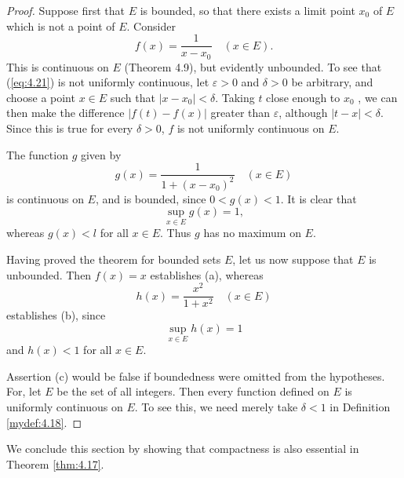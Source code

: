 \begin{proof}
    Suppose first that $E$ is bounded, 
    so that there exists a limit point $x_0$ of $E$ 
    which is not a point of $E$. 
    Consider
    \begin{equation}
        \label{eq:4.21}
        f(x) = \frac{1}{x - x_0}
        \quad
        (x \in E).
    \end{equation}
    This is continuous on $E$ (Theorem 4.9), but evidently unbounded. 
    To see that (\ref{eq:4.21}) is not uniformly continuous, 
    let $\varepsilon > 0$ and $\delta > 0$ be arbitrary, 
    and choose a point $x \in E$ such that $\left| x - x_0 \right| < \delta$.
    Taking $t$ close enough to $x_0$ , 
    we can then make the difference $\left| f(t) - f(x) \right|$ greater than $\varepsilon$, although $\left| t-x \right| < \delta$.
    Since this is true for every $\delta > 0$, 
    $f$ is not uniformly continuous on $E$.

    The function $g$ given by
    \begin{equation}
        \label{eq:4.22}
        g(x) = \frac{1}{1+(x-x_0)^2}
        \quad
        (x \in E)
    \end{equation}
    is continuous on $E$, and is bounded, since $0 < g(x) < 1$. 
    It is clear that 
    \begin{equation*}
        \sup_{x \in E} g(x) = 1,
    \end{equation*}
    whereas $g(x) < l$ for all $x \in E$. Thus $g$ has no maximum on $E$.

    Having proved the theorem for bounded sets $E$, 
    let us now suppose that $E$ is unbounded. 
    Then $f(x) = x$ establishes (a), whereas
    \begin{equation}
        \label{eq:4.23}
        h(x) = \frac{x^2}{1 + x^2}
        \quad 
        (x \in E)
    \end{equation}
    establishes (b), since
    \begin{equation*}
        \sup_{x \in E} h(x) = 1
    \end{equation*}
    and $h(x) < 1$ for all $x \in E$.

    Assertion (c) would be false if boundedness were omitted from the
    hypotheses. 
    For, let $E$ be the set of all integers. 
    Then every function defined on $E$ is uniformly continuous on $E$. 
    To see this, we need merely take $\delta < 1$ in Definition \ref{mydef:4.18}.
\end{proof}

We conclude this section by showing that compactness is also essential in
Theorem \ref{thm:4.17}.


